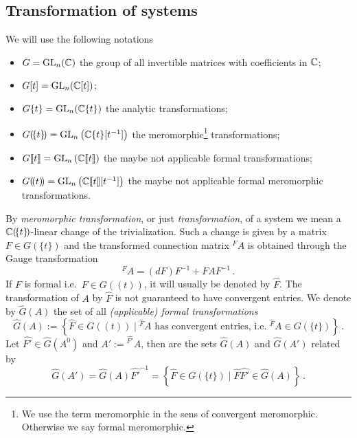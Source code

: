 \subsection{Transformation of systems}
\begin{notations}
  We will use the following notations
  \begin{itemize}
    \item $G=\operatorname{GL}_n(\mathbb{C})$ the group of all invertible matrices with coefficients
      in $\mathbb{C}$;
    \item $G[t]=\operatorname{GL}_n(\mathbb{C}[t])$;
    \item $G\{t\}=\operatorname{GL}_n(\mathbb{C}\{t\})$ the analytic transformations;
    \item $G(\!\{t\}\!)=\operatorname{GL}_n\left(\mathbb{C}\{t\}[t^{-1}]\right)$ the
      meromorphic\footnote{We use the term meromorphic in the sens of
      convergent meromorphic. Otherwise we say formal meromorphic.}
      transformations;
    \item $G\llbracket t\rrbracket=\operatorname{GL}_n\left(\mathbb{C}\llbracket t\rrbracket\right)$
      the maybe not applicable formal transformations;
    \item $G(\!(t)\!)=\operatorname{GL}_n\left(\mathbb{C}\llbracket t\rrbracket[t^{-1}]\right)$
      the maybe not applicable formal meromorphic transformations.
  \end{itemize}
\end{notations}
By \emph{meromorphic transformation}, or just \emph{transformation}, of a
system we mean a $\mathbb{C}(\!\{t\}\!)$-linear change of the trivialization.
Such a change is given by a matrix $F\in G(\!\{t\}\!)$ and the transformed
connection matrix ${}^F\!A$ is obtained through the Gauge transformation
\[
  {}^F\!A=(dF)F^{-1} + FAF^{-1} \,.
\]
If $F$ is formal i.e.\ $F\in G(\!(t)\!)$, it will usually be denoted by
$\hat F$.
The transformation of $A$ by $\hat F$ is not guaranteed to have convergent
entries.
We denote by $\hat G(A)$ the set of all \emph{(applicable) formal
transformations}
\[
  \hat G(A):=\left\{\hat F\in G(\!(t)\!)
    \mid {}^{\hat F}\!A
    \text{ has convergent entries, i.e.\ ${}^{\hat F}\!A\in G(\!\{t\}\!)$}
  \right\}\,.
\]
Let $\hat{F'}\in\hat G(A^0)$ and $A':={}^{\hat{F'}}\!A$, then are the sets
$\hat G(A)$ and $\hat G(A')$ related by
\[
  \hat G(A')=\hat G(A)\hat{F'}^{-1}=\left\{
    \hat F\in G(\!\{t\}\!) \mid \hat F\hat{F'}\in\hat G(A)
  \right\} \,.
\]

